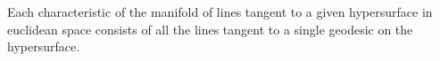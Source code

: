 Each characteristic of the manifold of lines tangent to a given hypersurface in euclidean space consists of all the lines tangent to a single geodesic on the hypersurface.
